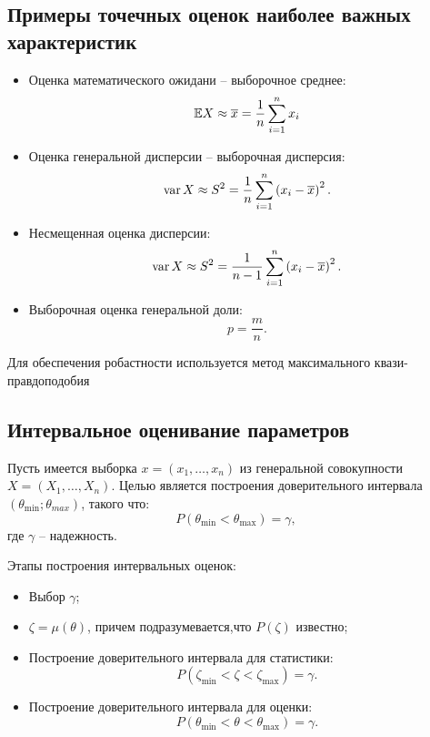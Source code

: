 \subsection*{Примеры точечных оценок наиболее важных характеристик}
\begin{itemize}
    \item Оценка математического ожидани -- выборочное среднее:
    \[
        \mathbb{E} X \approx \overline{x} = \dfrac{1}{n}\sum\limits_{i=1}^n x_i  
    \]
    \item Оценка генеральной дисперсии -- выборочная дисперсия:
    \[
        \operatorname{var} X \approx S^2 = \dfrac{1}{n} \sum\limits_{i=1}^n \left(x_i - \overline{x}\right)^2.  
    \]
    \item Несмещенная оценка дисперсии:
    \[
        \operatorname{var} X \approx S^2 = \dfrac{1}{n-1} \sum\limits_{i=1}^n \left(x_i - \overline{x}\right)^2.  
    \]
    \item Выборочная оценка генеральной доли:
    \[
        p = \dfrac{m}{n}.  
    \]
\end{itemize}
\par 
Для обеспечения робастности используется метод максимального квази-правдоподобия
\subsection*{Интервальное оценивание параметров}
\par 
Пусть имеется выборка $x = \left(x_1, \ldots, x_n\right)$ из генеральной совокупности $X = \left(X_1, \ldots, X_n\right)$. Целью является построения доверительного интервала $\left(\theta_{\min}; \theta_{max}\right)$, такого что:
\[
    P\left(\theta_{\min} < \theta_{\max}\right) = \gamma,  
\]
где $\gamma$ -- надежность.
\par
Этапы построения интервальных оценок:
\begin{itemize}
    \item Выбор $\gamma$;
    \item $\zeta = \mu(\theta)$, причем подразумевается,что $P(\zeta)$ известно;
    \item Построение доверительного интервала для статистики:
    \[
        P\left(\zeta_{\min} < \zeta < \zeta_{\max}\right) = \gamma.  
    \]
    \item Построение доверительного интервала для оценки:
    \[
        P\left(\theta_{\min} < \theta < \theta_{\max}\right) = \gamma.
    \]
\end{itemize}

